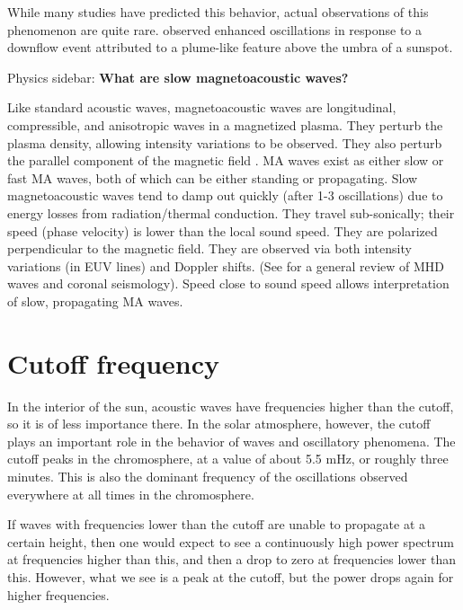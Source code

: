 While many studies have predicted this behavior,
actual observations of this phenomenon are quite rare.
\cite{Kwak2016}
observed enhanced oscillations in response to a downflow
event attributed to a plume-like feature above the umbra of a sunspot.


\begin{framed}
    Physics sidebar: \textbf{What are slow magnetoacoustic waves?}

    Like standard acoustic waves, magnetoacoustic waves are longitudinal,
    compressible, and anisotropic waves in a magnetized plasma.
    They perturb the plasma density, allowing intensity variations to be
    observed.
    They also perturb the parallel component of the magnetic field
    .
    MA waves exist as either slow or fast MA waves, both of which can be either
    standing or propagating.
    Slow magnetoacoustic waves tend to damp out
    quickly (after 1-3 oscillations) due to energy losses from
    radiation/thermal conduction.
    They travel sub-sonically; their
    speed (phase velocity) is lower than the local sound speed.
    They are polarized perpendicular to the magnetic field.
    They are observed
    via both intensity variations (in EUV lines) and Doppler shifts.
    (See \cite{Nakariakov2005} for a general review of MHD waves and coronal
    seismology).
    Speed close to sound speed
    allows interpretation of slow, propagating MA waves.
\end{framed}



\newpage
\section{Cutoff frequency}
In the interior of the sun, acoustic waves have frequencies higher than the
cutoff, so it is of less importance there. In the solar atmosphere, however,
the cutoff plays an important role in the behavior of waves and oscillatory
phenomena.
The cutoff peaks in the chromosphere, at a value of about 5.5 mHz,
or roughly three minutes. This is also the dominant frequency of the
oscillations observed everywhere at all times in the chromosphere.

If waves with frequencies lower than the cutoff are unable to propagate
at a certain height, then one would expect to see a continuously high power
spectrum at frequencies higher than this, and then a drop to zero at
frequencies lower than this. However, what we see is a peak at the cutoff,
but the power drops again for higher frequencies.

